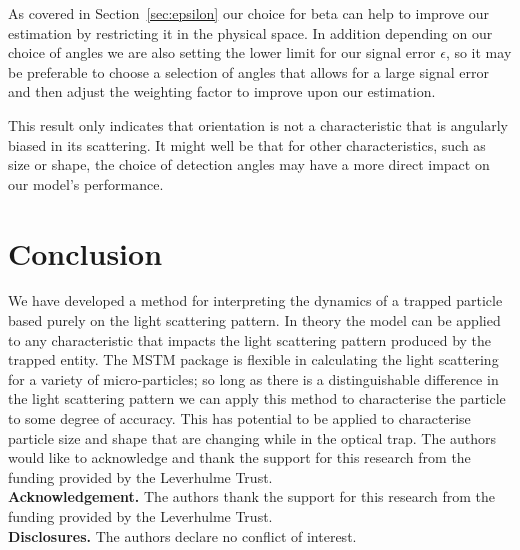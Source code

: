 \documentclass[final, 3p]{elsarticle}
\begin{document}
As covered in Section~\ref{sec:epsilon} our choice for beta can help to improve our estimation by restricting it in the physical space. In addition depending on our choice of angles we are also setting the lower limit for our signal error $\epsilon$, so it may be preferable to choose a selection of angles that allows for a large signal error and then adjust the weighting factor to improve upon our estimation.

This result only indicates that orientation is not a characteristic that is angularly biased in its scattering. It might well be that for other characteristics, such as size or shape, the choice of detection angles may have a more direct impact on our model's performance. 


\section{Conclusion}
\label{sec:Conclusion}

We have developed a method for interpreting the dynamics of a trapped
particle based purely on the light scattering pattern. In theory the
model can be applied to any characteristic that impacts the light
scattering pattern produced by the trapped entity. The MSTM package is
flexible in calculating the light scattering for a variety of
micro-particles; so long as there is a distinguishable difference in
the light scattering pattern we can apply this method to characterise
the particle to some degree of accuracy. This has potential to be
applied to characterise particle size and shape that are changing
while in the optical trap. The authors would like to acknowledge and
thank the support for this research from the funding provided by the
Leverhulme Trust.\\

\noindent \textbf{Acknowledgement.} The authors thank the support for this research from the funding provided by the Leverhulme Trust. \\
  
\noindent \textbf{Disclosures.} The authors declare no conflict of interest. \\


 

\end{document}

